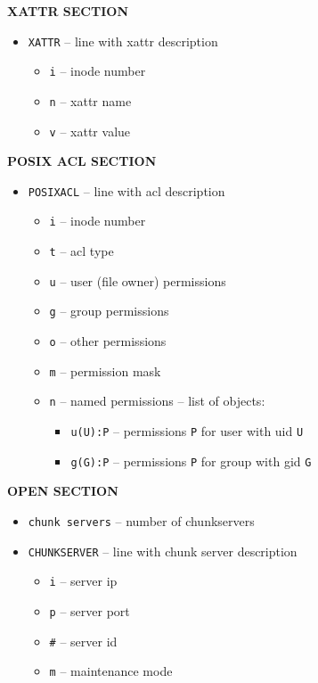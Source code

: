 \documentclass[a4paper,11pt,english]{report}
\def\code#1{\texttt{#1}}
\begin{document}
				\textbf{XATTR SECTION}
				\begin{itemize}
					\item \code{XATTR}     -- line with xattr description
					\begin{itemize}
						\item \code{i}      -- inode number
						\item \code{n}      -- xattr name
						\item \code{v}      -- xattr value
					\end{itemize}
				\end{itemize}
				\bigskip
				
				\textbf{POSIX ACL SECTION}
				\begin{itemize}
					\item \code{POSIXACL}  -- line with acl description
					\begin{itemize}
						\item \code{i}      -- inode number
						\item \code{t}      -- acl type
						\item \code{u}      -- user (file owner) permissions
						\item \code{g}      -- group permissions
						\item \code{o}      -- other permissions
						\item \code{m}      -- permission mask
						\item \code{n}      -- named permissions -- list of objects:
						\begin{itemize}
							\item \code{u(U):P}  -- permissions \code{P} for user with uid \code{U}
							\item \code{g(G):P}  -- permissions \code{P} for group with gid \code{G}
						\end{itemize}
					\end{itemize}
				\end{itemize}
				\bigskip
				
				\textbf{OPEN SECTION}
				\begin{itemize}
					\item \code{chunk servers}       -- number of chunkservers
					\item \code{CHUNKSERVER}         -- line with chunk server description
					\begin{itemize}
						\item \code{i}      -- server ip
						\item \code{p}      -- server port
						\item \code{\#}     -- server id
						\item \code{m}      -- maintenance mode
					\end{itemize}
				\end{itemize}
				\bigskip
				
\end{document}
